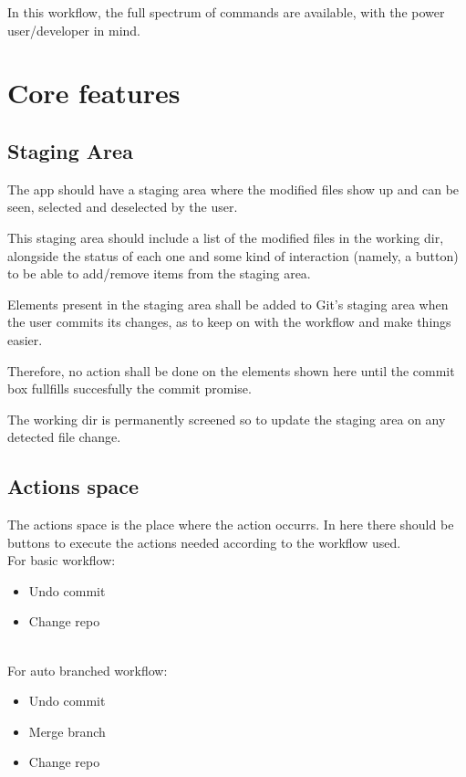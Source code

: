 \documentclass[GitEase.tex]{subfiles}
\begin{document}
In this workflow, the full spectrum of commands are available, with the power user/developer in mind.


\chapter{Core features}

\section{Staging Area}

The app should have a staging area where the modified files show up and can be seen, selected and deselected by the user.

This staging area should include a list of the modified files in the working dir, alongside the status of each one and some kind of interaction (namely, a button) to be able to add/remove items from the staging area.

Elements present in the staging area shall be added to Git's staging area when the user commits its changes, as to keep on with the workflow and make things easier.

Therefore, no action shall be done on the elements shown here until the commit box fullfills succesfully the commit promise.

The working dir is permanently screened so to update the staging area on any detected file change.

\section{Actions space}

The actions space is the place where the action occurrs. In here there should be buttons to execute the actions needed according to the workflow used.\\

For basic workflow:

\begin{itemize}
    \item Undo commit
    \item Change repo
\end{itemize}\hfill\\

For auto branched workflow:

\begin{itemize}
    \item Undo commit
    \item Merge branch
    \item Change repo
\end{itemize}\hfill\\
\end{document}
